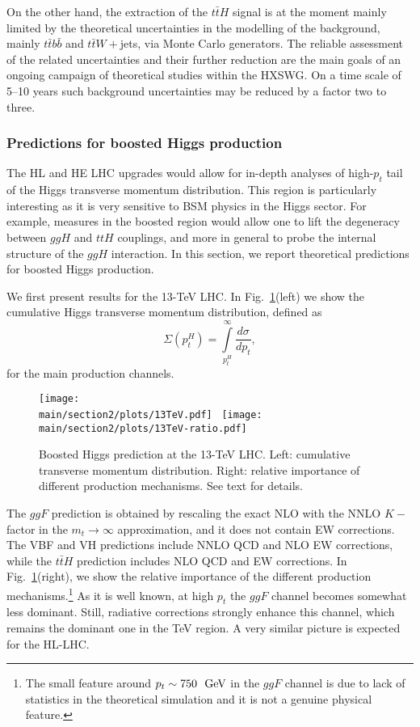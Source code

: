 On the other hand, the extraction of the $t \bar t H$ signal is at the moment mainly
limited by the theoretical uncertainties in the modelling of the background,
mainly $t\bar t b \bar b$ and $t \bar t W+$jets, via Monte Carlo generators. The reliable assessment of
the related uncertainties and their further reduction are the main goals of an
ongoing campaign of theoretical studies within the HXSWG. On a time scale of
5--10 years such background uncertainties may be reduced by a factor two to
three.

\subsubsection{Predictions for boosted Higgs production}
The HL and HE LHC upgrades would allow for in-depth analyses of high-$p_t$ tail of the Higgs
transverse momentum distribution. This region is particularly interesting as it is
very sensitive to BSM physics in the Higgs sector. For example, measures in the boosted region would 
allow one to lift the degeneracy between $ggH$ and $ttH$ couplings, and more in general to 
probe the internal structure of the $ggH$ interaction. In this section, we report theoretical
predictions for boosted Higgs production. 

We first present results for the 13-TeV LHC. In Fig.~\ref{fig:boosted13}(left) we show the cumulative Higgs 
transverse momentum distribution, defined as
$$
\Sigma(p_t^H) = \int\limits_{p_t^H}^{\infty} \frac{d\sigma}{d p_t},
$$
for the main production channels.
\begin{figure}[h]
\begin{center}
    \texttt{[image: \\main/section2/plots/13TeV.pdf]}~
    \texttt{[image: \\main/section2/plots/13TeV-ratio.pdf]}
    \caption{
    Boosted Higgs prediction at the 13-TeV LHC. Left: cumulative transverse momentum distribution.
    Right: relative importance of different production mechanisms. See text for details. 
        \label{fig:boosted13}}
        \end{center}
\end{figure}
The $ggF$ prediction is obtained by rescaling the exact NLO with the NNLO $K-$factor in the $m_t\to\infty$
approximation, and it does not contain EW corrections. The VBF and VH predictions include NNLO QCD
and NLO EW corrections, while the $t\bar t H$ prediction includes NLO QCD and EW corrections. In
Fig.~\ref{fig:boosted13}(right), we show the relative importance of the different production mechanisms.\footnote{
The small feature around $p_t\sim 750~{\rm ~\text{GeV}}$ in the $ggF$ channel is due to lack of statistics in the
theoretical simulation and it is not a genuine physical feature.}
As it is well known, at high $p_t$ the $ggF$ channel becomes somewhat less dominant. Still, radiative
corrections strongly enhance this channel, which remains the dominant one in the TeV region. A very similar picture is expected for the HL-LHC. 

